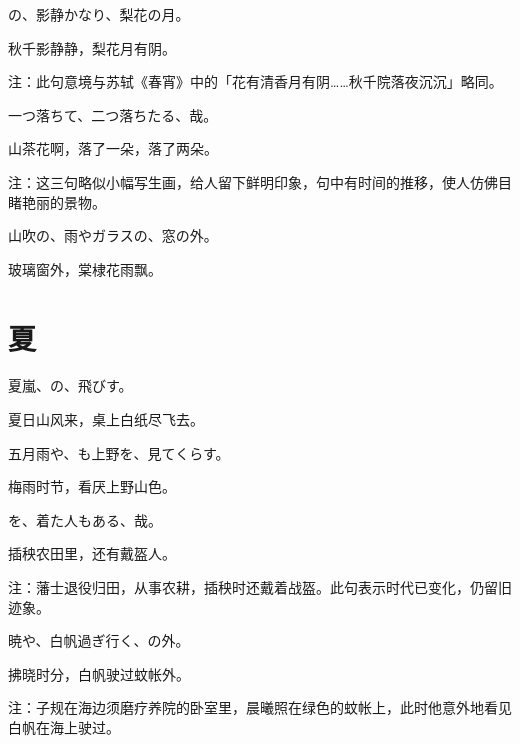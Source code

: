 \begin{haiku}
    {\FH {}の、影静かなり、梨花の月。}

    {\FK 秋千影静静，梨花月有阴。}

    {\FT 注：此句意境与苏轼《春宵》中的「花有清香月有阴……秋千院落夜沉沉」略同。}
\end{haiku}

\begin{haiku}
    {\FH 一つ落ちて、二つ落ちたる、哉。}

    {\FK 山茶花啊，落了一朵，落了两朵。}

    {\FT 注：这三句略似小幅写生画，给人留下鲜明印象，句中有时间的推移，使人仿佛目睹艳丽的景物。}
\end{haiku}

\begin{haiku}
    {\FH 山吹の、雨やガラスの、窓の外。}

    {\FK 玻璃窗外，棠棣花雨飘。}
\end{haiku}

\section{\FK 夏}

\setcounter{haikucounter}{0}

\begin{haiku}
    {\FH 夏嵐、の、飛びす。}

    {\FK 夏日山风来，桌上白纸尽飞去。}
\end{haiku}

\begin{haiku}
    {\FH 五月雨や、も上野を、見てくらす。}

    {\FK 梅雨时节，看厌上野山色。}
\end{haiku}

\begin{haiku}
    {\FH {}を、着た人もある、哉。}

    {\FK 插秧农田里，还有戴盔人。}

    {\FT 注：藩士退役归田，从事农耕，插秧时还戴着战盔。此句表示时代已变化，仍留旧迹象。}
\end{haiku}

\begin{haiku}
    {\FH 暁や、白帆過ぎ行く、の外。}

    {\FK 拂晓时分，白帆驶过蚊帐外。}

    {\FT 注：子规在海边须磨疗养院的卧室里，晨曦照在绿色的蚊帐上，此时他意外地看见白帆在海上驶过。}
\end{haiku}

